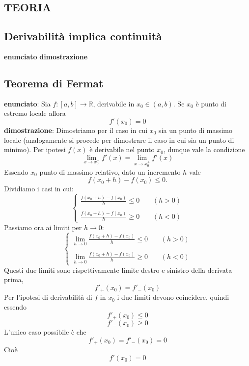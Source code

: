 \documentclass[a4paper, 9pt]{report}
\begin{document}
\newpage
\subsection*{TEORIA}
\subsection*{Derivabilità implica continuità}
\textbf{enunciato}\newline
\textbf{dimostrazione}\newline






\newpage
\subsection*{Teorema di Fermat}
\textbf{enunciato}:\newline
Sia $f:[a,b]\rightarrow \mathbb{R}$, derivabile in $x_0 \in(a,b)$. Se $x_0$ è punto di estremo locale allora
\[
    f'(x_0) = 0
\]
\textbf{dimostrazione}:\newline
Dimostriamo per il caso in cui $x_0$ sia un punto di massimo locale (analogamente si procede per dimostrare il caso in cui sia un punto di minimo). \newline
Per ipotesi $f(x)$ è derivabile nel punto $x_0$, dunque vale la condizione
\[
    \lim_{x\rightarrow x_0^-} f'(x) = \lim_{x\rightarrow x_0^+} f'(x)
\]
Essendo $x_0$ punto di massimo relativo, dato un incremento $h$ vale 
\[
    f(x_0 +h) - f(x_0) \leq 0.
\]
Dividiamo i casi in cui:
\[
    \begin{cases}
        \frac{f(x_0 +h) - f(x_0)}{h} \leq 0 \;\;\;\; &(h>0)\\
        \\
        \frac{f(x_0 +h) - f(x_0)}{h} \geq 0 &(h<0)
    \end{cases}
\]
Passiamo ora ai limiti per $h \rightarrow 0$:
\[
    \begin{cases}
        \lim_{h\rightarrow 0}\frac{f(x_0 +h) - f(x_0)}{h} \leq 0 \;\;\;\; &(h>0)\\
        \\
        \lim_{h\rightarrow 0}\frac{f(x_0 +h) - f(x_0)}{h} \geq 0 &(h<0)
    \end{cases}
\]
Questi due limiti sono rispettivamente limite destro e sinistro della derivata prima,
\[
    f'_+(x_0) = f'_-(x_0)
\]
Per l'ipotesi di derivabilità di $f$ in $x_0$ i due limiti devono coincidere, quindi essendo
\[
    f'_+(x_0) \leq 0
\]
\[
    f'_-(x_0) \geq 0
\]
L'unico caso possibile è che
\[
    f'_+(x_0) = f'_-(x_0) = 0
\]
Cioè
\[
    f'(x_0) = 0
\]
\end{document}
